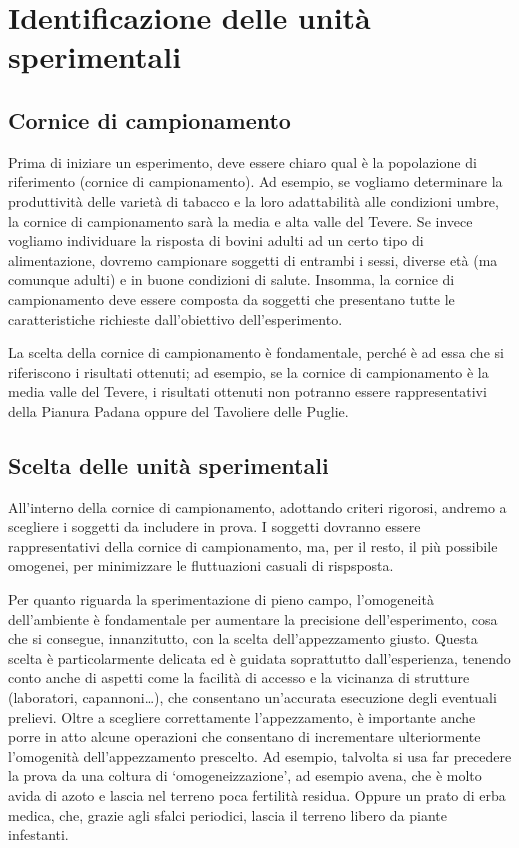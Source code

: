 \documentclass[a4paper,12pt,oneside]{book}
\theoremstyle{definition}
\theoremstyle{definition}
\theoremstyle{definition}
\theoremstyle{remark}
\begin{document}
\section{Identificazione delle unità
sperimentali}\label{identificazione-delle-unita-sperimentali}

\subsection{Cornice di campionamento}\label{cornice-di-campionamento}

Prima di iniziare un esperimento, deve essere chiaro qual è la
popolazione di riferimento (cornice di campionamento). Ad esempio, se
vogliamo determinare la produttività delle varietà di tabacco e la loro
adattabilità alle condizioni umbre, la cornice di campionamento sarà la
media e alta valle del Tevere. Se invece vogliamo individuare la
risposta di bovini adulti ad un certo tipo di alimentazione, dovremo
campionare soggetti di entrambi i sessi, diverse età (ma comunque
adulti) e in buone condizioni di salute. Insomma, la cornice di
campionamento deve essere composta da soggetti che presentano tutte le
caratteristiche richieste dall'obiettivo dell'esperimento.

La scelta della cornice di campionamento è fondamentale, perché è ad
essa che si riferiscono i risultati ottenuti; ad esempio, se la cornice
di campionamento è la media valle del Tevere, i risultati ottenuti non
potranno essere rappresentativi della Pianura Padana oppure del
Tavoliere delle Puglie.

\subsection{Scelta delle unità
sperimentali}\label{scelta-delle-unita-sperimentali}

All'interno della cornice di campionamento, adottando criteri rigorosi,
andremo a scegliere i soggetti da includere in prova. I soggetti
dovranno essere rappresentativi della cornice di campionamento, ma, per
il resto, il più possibile omogenei, per minimizzare le fluttuazioni
casuali di rispsposta.

Per quanto riguarda la sperimentazione di pieno campo, l'omogeneità
dell'ambiente è fondamentale per aumentare la precisione
dell'esperimento, cosa che si consegue, innanzitutto, con la scelta
dell'appezzamento giusto. Questa scelta è particolarmente delicata ed è
guidata soprattutto dall'esperienza, tenendo conto anche di aspetti come
la facilità di accesso e la vicinanza di strutture (laboratori,
capannoni\ldots{}), che consentano un'accurata esecuzione degli
eventuali prelievi. Oltre a scegliere correttamente l'appezzamento, è
importante anche porre in atto alcune operazioni che consentano di
incrementare ulteriormente l'omogenità dell'appezzamento prescelto. Ad
esempio, talvolta si usa far precedere la prova da una coltura di
`omogeneizzazione', ad esempio avena, che è molto avida di azoto e
lascia nel terreno poca fertilità residua. Oppure un prato di erba
medica, che, grazie agli sfalci periodici, lascia il terreno libero da
piante infestanti.
\end{document}

